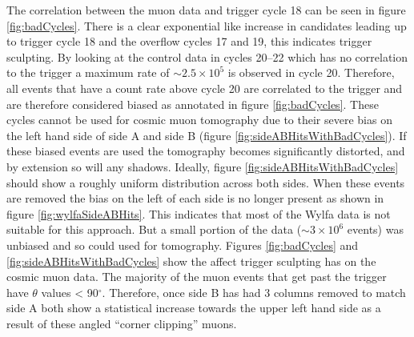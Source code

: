 
The correlation between the muon data and trigger cycle 18 can be seen in figure \ref{fig:badCycles}. There is a clear exponential like increase in candidates leading up to trigger cycle 18 and the overflow cycles 17 and 19, this indicates trigger sculpting. By looking at the control data in cycles 20--22 which has no correlation to the trigger a maximum rate of $\sim 2.5 \times 10^5$ is observed in cycle 20. Therefore, all events that have a count rate above cycle 20 are correlated to the trigger and are therefore considered biased as annotated in figure \ref{fig:badCycles}. These cycles cannot be used for cosmic muon tomography due to their severe bias on the left hand side of side A and side B (figure \ref{fig:sideABHitsWithBadCycles}). If these biased events are used the tomography becomes significantly distorted, and by extension so will any shadows. Ideally, figure \ref{fig:sideABHitsWithBadCycles} should show a roughly uniform distribution across both sides. When these events are removed the bias on the left of each side is no longer present as shown in figure \ref{fig:wylfaSideABHits}. This indicates that most of the Wylfa data is not suitable for this approach. But a small portion of the data ($\sim 3 \times 10^6$ events) was unbiased and so could used for tomography. Figures \ref{fig:badCycles} and \ref{fig:sideABHitsWithBadCycles} show the affect trigger sculpting has on the cosmic muon data. The majority of the muon events that get past the trigger have $\theta$ values < 90$^\circ$. Therefore, once side B has had 3 columns removed to match side A both show a statistical increase towards the upper left hand side as a result of these angled ``corner clipping'' muons.

